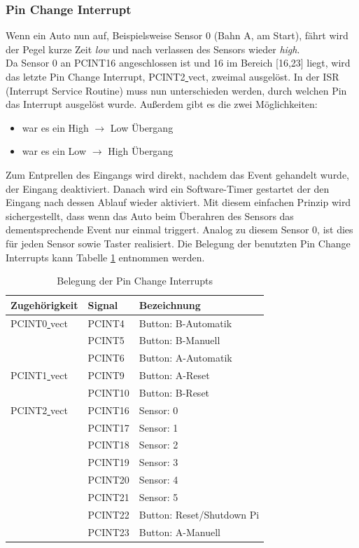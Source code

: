 \documentclass[a4paper, 11pt]{report}
\begin{document}
			\subsubsection {Pin Change Interrupt}\label{subsubsec:PCINT}
			Wenn ein Auto nun auf, Beispielsweise Sensor 0 (Bahn A, am Start), fährt wird der Pegel kurze Zeit \emph{low} und nach verlassen des Sensors wieder \emph{high}.\\ Da Sensor 0 an PCINT16 angeschlossen ist und 16 im Bereich [16,23] liegt, wird das letzte Pin Change Interrupt, PCINT2\underline{ }vect, zweimal ausgelöst. In der ISR (Interrupt Service Routine) muss nun unterschieden werden, durch welchen Pin das Interrupt ausgelöst wurde.
			Außerdem gibt es die zwei Möglichkeiten:
				\begin{itemize}
					\item war es ein High $\rightarrow$ Low Übergang
					\item war es ein Low $\rightarrow$ High Übergang
				\end{itemize}

			Zum Entprellen des Eingangs wird direkt, nachdem das Event gehandelt wurde, der Eingang deaktiviert. Danach wird ein Software-Timer gestartet der den Eingang nach dessen Ablauf wieder aktiviert. Mit diesem einfachen Prinzip wird sichergestellt, dass wenn das Auto beim Überahren des Sensors das dementsprechende Event nur einmal triggert.
			Analog zu diesem Sensor 0, ist dies für jeden Sensor sowie Taster realisiert. Die Belegung der benutzten Pin Change Interrupts kann Tabelle \ref{tab:belegungpcint} entnommen werden.
			\begin{table}[ht]
				\begin{tabular}{|l|l|l|}
					\hline
					Zugehörigkeit & Signal & Bezeichnung\\
					\hline
					\hline
					PCINT0\underline{ }vect & PCINT4 & Button: B-Automatik\\
					\hline
											& PCINT5 & Button: B-Manuell\\
					\hline
											& PCINT6 & Button: A-Automatik\\
					\hline
					\hline
					PCINT1\underline{ }vect & PCINT9 & Button: A-Reset\\
					\hline
											& PCINT10 & Button: B-Reset\\
					\hline
					\hline
					PCINT2\underline{ }vect & PCINT16 & Sensor: 0\\
					\hline
											& PCINT17 & Sensor: 1\\
					\hline
											& PCINT18 & Sensor: 2\\
					\hline
											& PCINT19 & Sensor: 3\\
					\hline
											& PCINT20 & Sensor: 4\\
					\hline
											& PCINT21 & Sensor: 5\\
					\hline
											& PCINT22 & Button: Reset/Shutdown Pi\\
					\hline
											& PCINT23 & Button: A-Manuell\\
					\hline
				\end{tabular}
				\caption{Belegung der Pin Change Interrupts}
				\label{tab:belegungpcint}
			\end{table}
\end{document}

